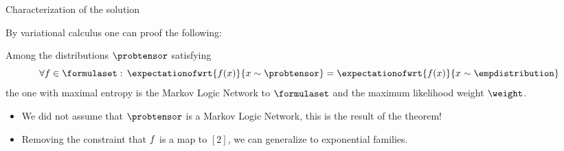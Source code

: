 \documentclass{beamer}
\begin{document}
\begin{frame}{Characterization of the solution}

By variational calculus one can proof the following:

\begin{theorem}
	Among the distributions $\probtensor$ satisfying 
	 	\[ \forall \exformulain : \, \expectationofwrt{\exformula(x)}{x\sim\probtensor} = \expectationofwrt{\exformula(x)}{x\sim\empdistribution}  \]
	the one with maximal entropy is the Markov Logic Network to $\formulaset$ and the maximum likelihood weight $\weight$.
\end{theorem}

\begin{itemize}
	\item We did not assume that $\probtensor$ is a Markov Logic Network, this is the result of the theorem!
	\item Removing the constraint that $f$ is a map to $[2]$, we can generalize to exponential families.
\end{itemize}

\end{frame}
\end{document}
